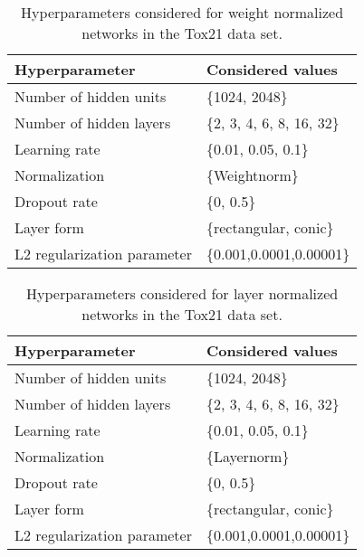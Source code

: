 \documentclass{article}
\begin{document}
\begin{table}[htp]
\begin{center}
\caption{Hyperparameters considered for weight normalized networks in the Tox21 data set.}

\begin{tabular}{ll}
\toprule
Hyperparameter  & Considered values \\ 
\midrule
  Number of hidden units & \{1024, 2048\} \\
  Number of hidden layers & \{2, 3, 4, 6, 8, 16, 32\} \\
  Learning rate & \{0.01, 0.05, 0.1\} \\
  Normalization & \{Weightnorm\} \\
  Dropout rate & \{0, 0.5\} \\
  Layer form & \{rectangular, conic\} \\
  L2 regularization parameter &  \{0.001,0.0001,0.00001\} \\
\bottomrule
\end{tabular}
\end{center}

\end{table}



\begin{table}[htp]
\begin{center}
\caption{Hyperparameters considered for layer normalized networks in the Tox21 data set.}

\begin{tabular}{ll}
\toprule
Hyperparameter  & Considered values \\ 
\midrule
  Number of hidden units & \{1024, 2048\} \\
  Number of hidden layers & \{2, 3, 4, 6, 8, 16, 32\} \\
  Learning rate & \{0.01, 0.05, 0.1\} \\
  Normalization & \{Layernorm\} \\
  Dropout rate & \{0, 0.5\} \\
  Layer form & \{rectangular, conic\} \\
  L2 regularization parameter &  \{0.001,0.0001,0.00001\} \\

\bottomrule
\end{tabular}
\end{center}

\end{table}
\end{document}
